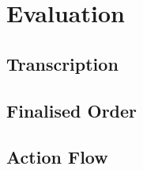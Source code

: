 \section{Evaluation}


\subsection{Transcription}


\subsection{Finalised Order}


\subsection{Action Flow}

